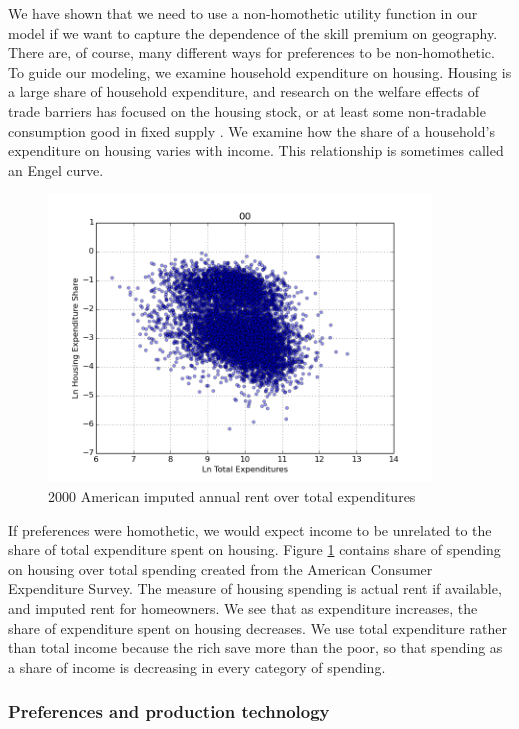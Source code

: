 \documentclass{article}
\begin{document}
We have shown that we need to use a non-homothetic utility function in our model if we want to capture the dependence of the skill premium on geography.  There are, of course, many different ways for preferences to be non-homothetic.  To guide our modeling, we examine household expenditure on housing.   Housing is a large share of household expenditure, and research on the welfare effects of trade barriers has focused on the housing stock, or at least some non-tradable consumption good in fixed supply \citep{helpman1998size,redding2008costs}.  We examine how the share of a household's expenditure on housing varies with income.  This relationship is sometimes called an Engel curve.

\begin{figure}
    \begin{center}
        \includegraphics[width=4in]{pics/rent_shr_wage_scatter_00.png}
    \end{center}
    \caption{2000 American imputed annual rent over total expenditures}
    \label{fig:wage_rent}
\end{figure}

If preferences were homothetic, we would expect income to be unrelated to the share of total expenditure spent on housing.  Figure \ref{fig:wage_rent} contains share of spending on housing over total spending created from the American Consumer Expenditure Survey.  The measure of housing spending is actual rent if available, and imputed rent for homeowners.  We see that as expenditure increases, the share of expenditure spent on housing decreases.  We use total expenditure rather than total income because the rich save more than the poor, so that spending as a share of income is decreasing in every category of spending.

\subsubsection{Preferences and production technology}
\end{document}
